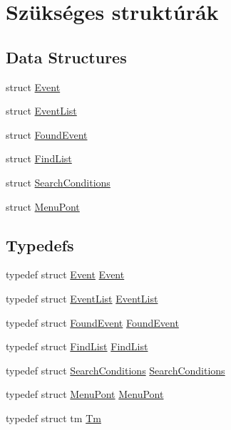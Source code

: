 \hypertarget{group__structures}{}\section{Szükséges struktúrák}
\label{group__structures}
\subsection*{Data Structures}
\begin{DoxyCompactItemize}
\item 
struct \hyperlink{struct_event}{Event}
\item 
struct \hyperlink{struct_event_list}{Event\+List}
\item 
struct \hyperlink{struct_found_event}{Found\+Event}
\item 
struct \hyperlink{struct_find_list}{Find\+List}
\item 
struct \hyperlink{struct_search_conditions}{Search\+Conditions}
\item 
struct \hyperlink{struct_menu_pont}{Menu\+Pont}
\end{DoxyCompactItemize}
\subsection*{Typedefs}
\begin{DoxyCompactItemize}
\item 
typedef struct \hyperlink{struct_event}{Event} \hyperlink{group__structures_ga607b119a19e65e2c1c7a606f21ab7a46}{Event}
\item 
typedef struct \hyperlink{struct_event_list}{Event\+List} \hyperlink{group__structures_ga7faf24c32c52b92939a97982baf9dedf}{Event\+List}
\item 
typedef struct \hyperlink{struct_found_event}{Found\+Event} \hyperlink{group__structures_gac0286403197d5147979a4986c9425222}{Found\+Event}
\item 
typedef struct \hyperlink{struct_find_list}{Find\+List} \hyperlink{group__structures_gad7aca260cf976ef8a90cbe97ab5dba48}{Find\+List}
\item 
typedef struct \hyperlink{struct_search_conditions}{Search\+Conditions} \hyperlink{group__structures_gadc5706147428e7cb68faa6fb19085d7a}{Search\+Conditions}
\item 
typedef struct \hyperlink{struct_menu_pont}{Menu\+Pont} \hyperlink{group__structures_ga0ef80ab3e0ae7fe6915f17204e5f6211}{Menu\+Pont}
\item 
typedef struct tm \hyperlink{group__structures_gaffc453d30a4a6ce81ed778fd04d2d256}{Tm}
\end{DoxyCompactItemize}



